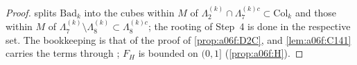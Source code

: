 \begin{proof}
 splits $\mathrm{Bad}_k$ into the cubes within $M$ of $\Lambda^{(k)}_2\cap\Lambda^{(k)c}_7\subset\mathrm{Col}_k$ and those within $M$ of $\Lambda^{(k)}_7\setminus\Lambda^{(k)}_8\subset\Lambda^{(k)c}_8$; the rooting of Step~4 is done in the respective set. The bookkeeping is that of the proof of \cref{prop:a06f:D2C}, and \cref{lem:a06f:C141} carries the terms through \cite[Sect.~3A]{Ba2}; $F_H$ is bounded on $(0,1]$ (\cref{prop:a06f:H}).
\end{proof}
